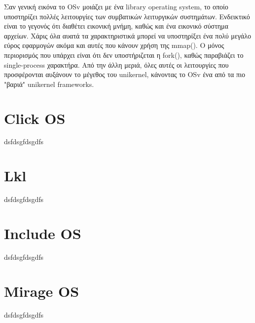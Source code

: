 Σαν γενική εικόνα το OSv μοιάζει με ένα library operating system, το οποίο
υποστηρίζει πολλές λειτουργίες των συμβατικών λειτυργικών συστημάτων. Ενδεικτικό
είναι το γεγονός ότι διαθέτει εικονική μνήμη, καθώς και ένα εικονικό σύστημα
αρχείων. Χάρις όλα αυατά τα χαρακτηριστικά μπορεί να υποστηρίξει ένα πολύ μεγάλο
εύρος εφαρμογών ακόμα και αυτές που κάνουν χρήση της mmap(). Ο μόνος περιορισμός
που υπάρχει είναι ότι δεν υποστήριζεται η fork(), καθώς παραβιάζει το
single-process χαρακτήρα. Από την άλλη μεριά, όλες αυτές οι λειτουργίες που
προσφέρονται αυξάνουν το μέγεθος του unikernel, κάνοντας το OSv ένα από τα πιο
"βαριά" unikernel frameworks. 


\section{Click OS}
dsfdsgfdsgdfs

\section{Lkl}
dsfdsgfdsgdfs

\section{Include OS}
dsfdsgfdsgdfs

\section{Mirage OS}
dsfdsgfdsgdfs



